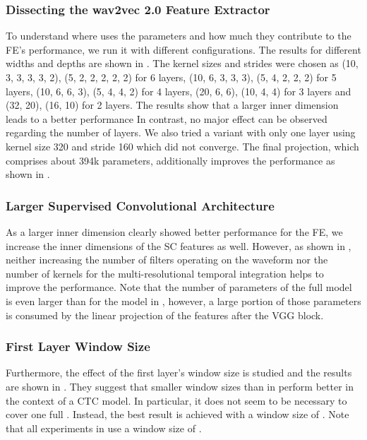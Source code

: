 \documentclass{INTERSPEECH2023}
\begin{document}
\subsubsection{Dissecting the wav2vec 2.0 Feature Extractor}
\label{sec:w2v_components}
To understand where \wvtwo uses the parameters and how much they contribute to the \gls{FE}'s performance, we run it with different configurations.
The results for different widths and depths are shown in .
The kernel sizes and strides were chosen as (10, 3, 3, 3, 3, 2), (5, 2, 2, 2, 2, 2) for 6 layers, (10, 6, 3, 3, 3), (5, 4, 2, 2, 2) for 5 layers, (10, 6, 6, 3), (5, 4, 4, 2) for 4 layers, (20, 6, 6), (10, 4, 4) for 3 layers and (32, 20), (16, 10) for 2 layers.
The results show that a larger inner dimension leads to a better performance
In contrast, no major effect can be observed regarding the number of layers.
We also tried a variant with only one layer using kernel size 320 and stride 160 which did not converge.
The final projection, which comprises about 394k parameters, additionally improves the performance as shown in .



\subsubsection{Larger Supervised Convolutional Architecture}
\label{sec:scf_size}
As a larger inner dimension clearly showed better performance for the \wvtwo \gls{FE}, we increase the inner dimensions of the \gls{SC} features as well.
However, as shown in , neither increasing the number of filters operating on the waveform nor the number of kernels for the multi-resolutional temporal integration helps to improve the performance.
Note that the number of parameters of the full model is even larger than for the \wvtwo model in , however, a large portion of those parameters is consumed by the linear projection of the features after the \gls{VGG} block.


\subsubsection{First Layer Window Size}
\label{sec:scf_first_window}
Furthermore, the effect of the first layer's window size is studied and the results are shown in .
They suggest that smaller window sizes than in \cite{tuske2018:waveform} perform better in the context of a \conformer \gls{CTC} model.
In particular, it does not seem to be necessary to cover one full . %
Instead, the best result is achieved with a window size of .
Note that all experiments in  use a window size of .

\end{document}
